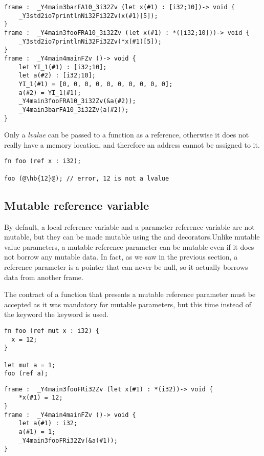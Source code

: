 \begin{lstlisting}[style=intermediateVerb, caption=YIL result of Listing~\ref{lst:result_copy_v_ref_array}]
frame :  _Y4main3barFA10_3i32Zv (let x(#1) : [i32;10])-> void {
    _Y3std2io7printlnNi32Fi32Zv(x(#1)[5]);
}
frame :  _Y4main3fooFRA10_3i32Zv (let x(#1) : *([i32;10]))-> void {
    _Y3std2io7printlnNi32Fi32Zv(*x(#1)[5]);
}
frame :  _Y4main4mainFZv ()-> void {
    let YI_1(#1) : [i32;10];
    let a(#2) : [i32;10];
    YI_1(#1) = [0, 0, 0, 0, 0, 0, 0, 0, 0, 0];
    a(#2) = YI_1(#1);
    _Y4main3fooFRA10_3i32Zv(&a(#2));
    _Y4main3barFA10_3i32Zv(a(#2));
}
\end{lstlisting}

Only a \textit{lvalue} can be passed to a function as a reference, otherwise it
does not really have a memory location, and therefore an address cannot be
assigned to it.

\begin{lstlisting}[style=coloredverbatim, escapechar=@]
fn foo (ref x : i32);

foo (@\hb{12}@); // error, 12 is not a lvalue
\end{lstlisting}

\subsection {Mutable reference variable}
\label{sec:mut_ref_param}

By default, a local reference variable and a parameter reference variable are
not mutable, but they can be made mutable using the  and 
decorators.Unlike mutable value parameters, a mutable reference parameter can be
mutable even if it does not borrow any mutable data. In fact, as we saw in the
previous section, a reference parameter is a pointer that can never be null, so
it actually borrows data from another frame.

The contract of a function that presents a mutable reference parameter must be
accepted as it was mandatory for mutable parameters, but this time instead of
the keyword  the keyword  is used.

\begin{lstlisting}[style=coloredverbatim]
fn foo (ref mut x : i32) {
  x = 12;
}

let mut a = 1;
foo (ref a);
\end{lstlisting}

\begin {lstlisting}[style=intermediateVerb]
frame :  _Y4main3fooFRi32Zv (let x(#1) : *(i32))-> void {
    *x(#1) = 12;
}
frame :  _Y4main4mainFZv ()-> void {
    let a(#1) : i32;
    a(#1) = 1;
    _Y4main3fooFRi32Zv(&a(#1));
}
\end{lstlisting}

